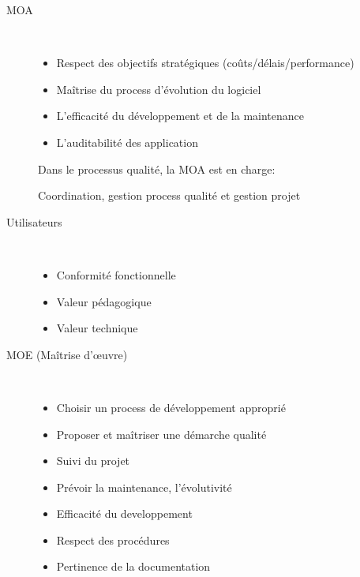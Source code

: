 \begin{description}

    \item[MOA]\hfill\\
		\begin{itemize}
		\item Respect des objectifs stratégiques (coûts/délais/performance)
		\item Maîtrise du process d’évolution du logiciel
		\item L’efficacité du développement et de la maintenance
		\item L’auditabilité des application
		\end{itemize}

		Dans le processus qualité, la MOA est en charge:
	
	Coordination, gestion process qualité et gestion projet

	\item[Utilisateurs]\hfill\\
		\begin{itemize}
		\item Conformité fonctionnelle
		\item Valeur pédagogique
		\item Valeur technique
		\end{itemize}

	\item[MOE (Maîtrise d'\oe{}uvre)]\hfill\\
		\begin{itemize}
		\item Choisir un process de développement approprié
		\item Proposer et maîtriser une démarche qualité
		\item Suivi du projet
		\item Prévoir la maintenance, l’évolutivité
		\item Efficacité du developpement
		\item Respect des procédures
		\item Pertinence de la documentation
		\end{itemize}
		
\end{description}




